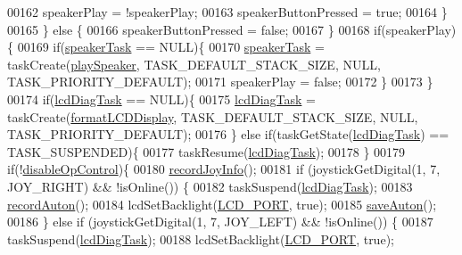 \begin{DoxyCode}
00162                     speakerPlay = !speakerPlay;
00163                     speakerButtonPressed = \textcolor{keyword}{true};
00164                 \}
00165             \} \textcolor{keywordflow}{else} \{
00166                 speakerButtonPressed = \textcolor{keyword}{false};
00167             \}
00168             \textcolor{keywordflow}{if}(speakerPlay)\{
00169                 \textcolor{keywordflow}{if}(\hyperlink{sensors_8c_a29754c0d165c3e366278bf93ee231e35}{speakerTask} == NULL)\{
00170                     \hyperlink{sensors_8c_a29754c0d165c3e366278bf93ee231e35}{speakerTask} = taskCreate(\hyperlink{sensors_8c_a44ad7c17f20379371c31ec8ba82ff03e}{playSpeaker}, TASK\_DEFAULT\_STACK\_SIZE, 
      NULL, TASK\_PRIORITY\_DEFAULT);
00171                     speakerPlay = \textcolor{keyword}{false};
00172                 \}
00173             \} 
00174             \textcolor{keywordflow}{if}(\hyperlink{lcddiag_8c_a2a17fd7ddf1721b3a9d9b2a3d728c365}{lcdDiagTask} == NULL)\{
00175                 \hyperlink{lcddiag_8c_a2a17fd7ddf1721b3a9d9b2a3d728c365}{lcdDiagTask} = taskCreate(\hyperlink{lcddiag_8c_af7a16cd7a10c542f5bfe3e4ad292c34d}{formatLCDDisplay}, 
      TASK\_DEFAULT\_STACK\_SIZE, NULL, TASK\_PRIORITY\_DEFAULT);
00176             \} \textcolor{keywordflow}{else} \textcolor{keywordflow}{if}(taskGetState(\hyperlink{lcddiag_8c_a2a17fd7ddf1721b3a9d9b2a3d728c365}{lcdDiagTask}) == TASK\_SUSPENDED)\{
00177                 taskResume(\hyperlink{lcddiag_8c_a2a17fd7ddf1721b3a9d9b2a3d728c365}{lcdDiagTask});
00178             \}
00179             \textcolor{keywordflow}{if}(!\hyperlink{lcddiag_8c_a0f0b335cd078d025d6fb720eb3bf6437}{disableOpControl})\{
00180                 \hyperlink{opcontrol_8c_a7e408f7d4d3cf1d5a4f6c9f1bae6e770}{recordJoyInfo}();
00181                 \textcolor{keywordflow}{if} (joystickGetDigital(1, 7, JOY\_RIGHT) && !isOnline()) \{
00182                     taskSuspend(\hyperlink{lcddiag_8c_a2a17fd7ddf1721b3a9d9b2a3d728c365}{lcdDiagTask});
00183                     \hyperlink{autonrecorder_8c_a1611f78b8c904848dcc98ae4b0b5b22b}{recordAuton}();
00184                     lcdSetBacklight(\hyperlink{lcdmsg_8h_abcf42bd88b3c36193f301ca25b033875}{LCD\_PORT}, \textcolor{keyword}{true});
00185                     \hyperlink{autonrecorder_8c_ae6b758086a3b984c6705e12859eed2cc}{saveAuton}();
00186                 \} \textcolor{keywordflow}{else} \textcolor{keywordflow}{if} (joystickGetDigital(1, 7, JOY\_LEFT) && !isOnline()) \{
00187                     taskSuspend(\hyperlink{lcddiag_8c_a2a17fd7ddf1721b3a9d9b2a3d728c365}{lcdDiagTask});
00188                     lcdSetBacklight(\hyperlink{lcdmsg_8h_abcf42bd88b3c36193f301ca25b033875}{LCD\_PORT}, \textcolor{keyword}{true});

\end{DoxyCode}
